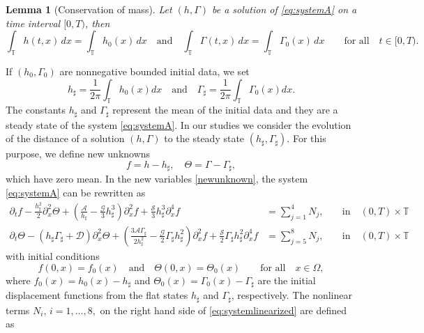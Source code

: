 \documentclass[reqno,11pt]{amsart}
\newcommand{\TT}{{\mathbb T}}
\newcommand{\pax}{\partial_x}
\newcommand{\bh}{h_\sharp}
\newcommand{\bG}{\Gamma_\sharp}
\newtheorem{lem}{Lemma}
\begin{document}
\begin{lem}[Conservation of mass]
Let $(h,\Gamma)$ be a solution of \eqref{eq:systemA} on a time interval $[0,T)$, then
\[
	\int_{\TT} h(t,x)\,dx =	\int_{\TT} h_0(x)\,dx\quad\mbox{and}\quad \int_{\TT} \Gamma(t,x)\,dx =	\int_{\TT} \Gamma_0(x)\,dx\qquad \mbox{for all}\quad t\in[0,T).
\]
\end{lem}

If $(h_0,\Gamma_0)$ are nonnegative bounded initial data, we set 
 $$
 \bh=\frac{1}{2\pi}\int_\TT h_0(x)dx\quad\mbox{and}\quad \bG=\frac{1}{2\pi}\int_\TT \Gamma_0(x)dx.
 $$
 The constants $\bh$ and $\bG$ represent the mean of the initial data and they are a steady state of the system \eqref{eq:systemA}. In our studies we consider the evolution of the distance of a solution $(h,\Gamma)$ to the steady state $(\bh,\bG)$. For this purpose, we define new unknowns
\begin{equation}\label{newunknown}
f=h-\bh,\quad \Theta=\Gamma-\bG,
\end{equation}
which have zero mean. 
In the new variables \eqref{newunknown}, the system \eqref{eq:systemA} can be rewritten as
\begin{subequations}\label{eq:systemlinearized}
\begin{alignat}{2}
\partial_t f-\frac{\bh^2}{2}\partial_x^2 \Theta +\left(\frac{\mathcal{A}}{\bh}-\frac{\mathcal{G}}{3}\bh^3\right)\partial_x^2 f+\frac{\mathcal{S}}{3}\bh^3\partial_x^4 f&=\sum_{j=1}^4 N_j,\; &&\mbox{in}\quad (0,T)\times \TT\\
\partial_t \Theta -\left(\bh\bG+\mathcal{D}\right)\pax^2\Theta+\left(\frac{3\mathcal{A}\bG}{2\bh^2}-\frac{\mathcal{G}}{2}\bG\bh^2\right) \pax^2f+\frac{\mathcal{S}}{2}\bG\bh^2 \pax^4f &= \sum_{j=5}^8 N_j,\;&& \mbox{in}\quad (0,T)\times \TT
\end{alignat}
\end{subequations}
with initial conditions
\[
f(0,x)=f_0(x)\quad \mbox{and}\quad \Theta(0,x)=\Theta_0(x)\qquad \mbox{for all} \quad x\in \Omega,
\]
where $f_0(x)=h_0(x)-\bh$ and $\Theta_0(x)=\Gamma_0(x)-\bG$ are the initial displacement functions from the flat states $\bh$ and $\bG$, respectively.
The nonlinear terms $N_i$, $i=1,\dots,8,$ on the right hand side of \eqref{eq:systemlinearized} are defined as
\end{document}
